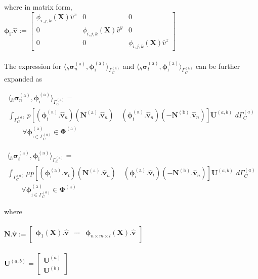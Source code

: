 where in matrix form,\\

$\bm \phi_{\mathrm{i}}.\bm{\hat{v}}:=
\begin{bmatrix}
 \phi_{i,j,k}(\bm X){\hat{v}}^x &0   &0\\ 
 0 & \phi_{i,j,k}(\bm X){\hat{v}}^y   &0\\
 0 &0   & \phi_{i,j,k}(\bm X){\hat{v}}^z
\end{bmatrix}
$\\
\\

The expression for ${\langle {}_h\bm{\sigma}^{\mathrm{(a)}}_n,  \bm \phi^{\mathrm{(a)}}_{\mathrm{i}} \rangle_{\Gamma_C^{\mathrm{(a)}}}}$ and ${\langle {}_h\bm{\sigma}^{\mathrm{(a)}}_t,  \bm \phi^{\mathrm{(a)}}_{\mathrm{i}} \rangle_{\Gamma_C^{\mathrm{(a)}}}}$ can be further expanded as 

\begin{multline}\label{cont_proj}
{\langle {}_h\bm{\sigma}^{\mathrm{(a)}}_n,  \bm \phi^{\mathrm{(a)}}_{\mathrm{i}} \rangle_{\Gamma_C^{\mathrm{(a)}}}} =\\
\int_{\Gamma^{(a)}_C} p[( \bm \phi^{\mathrm{(a)}}_{\mathrm{i}} . \bm{\hat{v}}_n)(\bm N^{\mathrm{(a)}}.\bm{\hat{v}}_n) \quad( \bm \phi^{\mathrm{(a)}}_{\mathrm{i}} . \bm{\hat{v}}_n)(- \bm N^{\mathrm{(b)}}.\bm{\hat{v}}_n)] \bm U^{(a,b)} \,\, d\Gamma^{(a)}_C \\ \qquad \forall \bm \phi^{\mathrm{(a)}}_{\mathrm{i}\in \Gamma_C^{(a)}} \in \bm\Phi^{\mathrm{(a)}}  
\end{multline}

\begin{multline}\label{fric_proj}
{\langle {}_h\bm{\sigma}^{\mathrm{(a)}}_t,  \bm \phi^{\mathrm{(a)}}_{\mathrm{i}} \rangle_{\Gamma_C^{\mathrm{(a)}}}} =\\
\int_{\Gamma^{(a)}_C} \mu p[( \bm \phi^{\mathrm{(a)}}_{\mathrm{i}} . \bm{\hat{v}}_t)(\bm N^{\mathrm{(a)}}.\bm{\hat{v}}_n) \quad( \bm \phi^{\mathrm{(a)}}_{\mathrm{i}} . \bm{\hat{v}}_t)(- \bm N^{\mathrm{(b)}}.\bm{\hat{v}}_n)] \bm U^{(a,b)} \,\, d\Gamma^{(a)}_C \\ \qquad \forall \bm \phi^{\mathrm{(a)}}_{\mathrm{i}\in \Gamma_C^{(a)}} \in \bm\Phi^{\mathrm{(a)}}  
\end{multline}

where \\
\\
$\bm N.\bm{\hat{v}}:=
\begin{bmatrix}
 \bm \phi_{1}(\bm X).\bm{\hat{v}} &\cdots   &\bm \phi_{n\times m \times l}(\bm X).\bm{\hat{v}} \\ 
\end{bmatrix}
$\\
\\
$\bm U^{(a,b)} = 
\begin{bmatrix}
{\bm U^{(a)}}\\
{\bm U^{(b)}}
\end{bmatrix}
$\\
\\

